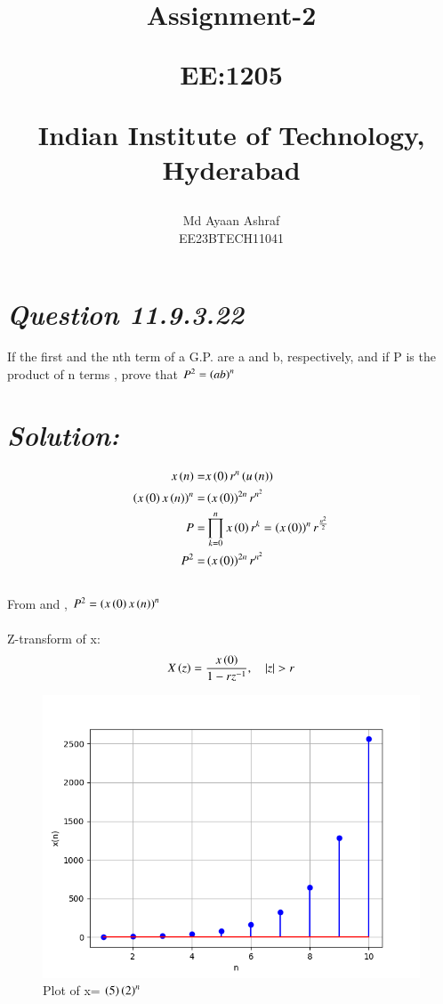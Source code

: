 \documentclass[journal,12pt,twocolumn]{IEEEtran}
\theoremstyle{remark}
\begin{document}
%




\vspace{3cm}

\title{
Assignment-2

\large{EE:1205 }

Indian Institute of Technology, Hyderabad
}
\author{Md Ayaan Ashraf

EE23BTECH11041
}  
\maketitle
\newpage
\bigskip
\renewcommand{\thefigure}{\theenumi}
\renewcommand{\thetable}{\theenumi}
\section*{\textit{\textbf{Question 11.9.3.22}}}
 If the first and the nth term of a G.P. are a and b, respectively, and if P is the product of n terms , prove that $ P^2 = \left(ab\right)^n $
\section*{\textit{\textbf{Solution:}}}

\begin{align}
x\left(n\right) = & x\left(0\right)r^{n} \left(u\left(n\right)\right)\\
\left(x\left(0\right)x\left(n\right)\right)^n = & \left(x\left(0\right)\right)^{2n} r^{n^2}\\
P =& \prod_{k=0}^{n} x\left(0\right)r^{k}= \left(x\left(0\right)\right)^n r^{\frac{n^2}{2}}\\
P^2 =& \left(x\left(0\right)\right)^{2n} r^{n^2}
\end{align}
\\
From  and  , $ P^2 = \left(x\left(0\right)x\left(n\right)\right)^n $\\
\\
Z-transform of x:
\begin{align}
X\brak{z}= \frac{x\brak{0}}{1-rz^{-1}} , \quad{|z|>r}
\end{align}
\begin{figure}[ht]
    \centering
    \includegraphics[width=\columnwidth]{figs/fig.png}
    \caption{Plot of x= $\left(5\right)\left(2\right)^n$}
    \label{fig: 11.9.3.22}
\end{figure}
\end{document}
